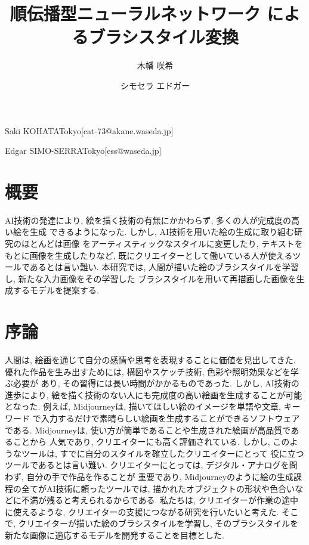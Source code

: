 \documentclass[MIRU,submit,uplatex]{miru2023j}
\begin{document}
\title{順伝播型ニューラルネットワーク によるブラシスタイル変換}


 \author{木幡 咲希}{Saki KOHATA}{Tokyo}[cat-73@akane.waseda.jp]
 \author{シモセラ エドガー}{Edgar SIMO-SERRA}{Tokyo}[ess@waseda.jp]

\maketitle

\section*{概要}
AI技術の発達により, 絵を描く技術の有無にかかわらず, 多くの人が完成度の高い絵を生成
できるようになった. しかし, AI技術を用いた絵の生成に取り組む研究のほとんどは画像
をアーティスティックなスタイルに変更したり, テキストをもとに画像を生成したりなど,
既にクリエイターとして働いている人が使えるツールであるとは言い難い. 
本研究では, 人間が描いた絵のブラシスタイルを学習し, 新たな入力画像をその学習した
ブラシスタイルを用いて再描画した画像を生成するモデルを提案する. 

\section{序論}
人間は, 絵画を通じて自分の感情や思考を表現することに価値を見出してきた.
優れた作品を生み出すためには, 構図やスケッチ技術, 色彩や照明効果などを学ぶ必要が
あり, その習得には長い時間がかかるものであった. しかし, AI技術の進歩により, 
絵を描く技術のない人にも完成度の高い絵画を生成することが可能となった.
例えば, Midjourney\cite{Midjourney}は, 描いてほしい絵のイメージを単語や文章, キーワード
で入力するだけで素晴らしい絵画を生成することができるソフトウェアである. 
Midjourneyは, 使い方が簡単であることや生成された絵画が高品質であることから
人気であり, クリエイターにも高く評価されている.
しかし, このようなツールは, すでに自分のスタイルを確立したクリエイターにとって
役に立つツールであるとは言い難い. 
クリエイターにとっては, デジタル・アナログを問わず, 自分の手で作品を作ることが
重要であり, Midjourneyのように絵の生成課程の全てがAI技術に頼ったツールでは, 
描かれたオブジェクトの形状や色合いなどに不満が残ると考えられるからである.
私たちは, クリエイターが作業の途中に使えるような, 
クリエイターの支援につながる研究を行いたいと考えた.
そこで, クリエイターが描いた絵のブラシスタイルを学習し, そのブラシスタイルを
新たな画像に適応するモデルを開発することを目標とした. 
\end{document}
